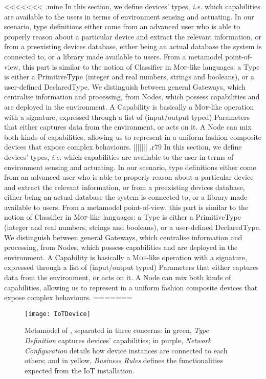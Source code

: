 <<<<<<< .mine
In this section, we define \IOT devices' types, \textit{i.e.} which capabilities are available to the users in terms of environment sensing and actuating. In our scenario, type definitions either come from an advanced user who is able to properly reason about a particular device and extract the relevant information, or from a preexisting devices database, either being an actual database the system is connected to, or a library made available to users. From a metamodel point-of-view, this part is similar to the notion of \textsf{Classifier} in \textsc{Mof}-like languages: a \textsf{Type} is either a \textsf{PrimitiveType} (integer and real numbers, strings and booleans), or a user-defined \textsf{DeclaredType}. We distinguish between general \textsf{Gateway}s, which centralise information and processing, from \textsf{Node}s, which possess capabilities and are deployed in the environment. A \textsf{Capability} is basically a \textsc{Mof}-like operation with a signature, expressed through a list of (input/output typed) \textsf{Parameter}s that either captures data from the environment, or acts on it. A \textsf{Node} can mix both kinds of capabilities, allowing us to represent in a uniform fashion composite devices that expose complex behaviours.
||||||| .r79
In this section, we define \IOT devices' types, \textit{i.e.} which capabilities are available to the user in terms of environment sensing and actuating. In our scenario, type definitions either come from an advanced user who is able to properly reason about a particular device and extract the relevant information, or from a preexisting devices database, either being an actual database the system is connected to, or a library made available to users. From a metamodel point-of-view, this part is similar to the notion of \textsf{Classifier} in \textsc{Mof}-like languages: a \textsf{Type} is either a \textsf{PrimitiveType} (integer and real numbers, strings and booleans), or a user-defined \textsf{DeclaredType}. We distinguish between general \textsf{Gateway}s, which centralise information and processing, from \textsf{Node}s, which possess capabilities and are deployed in the environment. A \textsf{Capability} is basically a \textsc{Mof}-like operation with a signature, expressed through a list of (input/output typed) \textsf{Parameter}s that either captures data from the environment, or acts on it. A \textsf{Node} can mix both kinds of capabilities, allowing us to represent in a uniform fashion composite devices that expose complex behaviours.
=======
\begin{figure*}%
\texttt{[image: IoTDevice]}%
\caption{Metamodel of \IOTDSL, separated in three concerns: in green, \emph{Type Definition} captures devices' capabilities; in purple, \emph{Network Configuration} details how device instances are connected to each others; and in yellow, \emph{Business Rules} defines the functionalities expected from the IoT installation.}%
\label{fig:IoTDevice-MM}%
\end{figure*}

